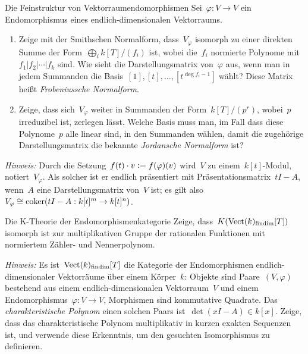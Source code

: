\documentclass{uebblatt}
\begin{document}
\begin{aufgabe}{Die Feinstruktur von Vektorraumendomorphismen}
Sei~$\varphi : V \to V$ ein Endomorphismus eines endlich-dimensionalen
Vektorraums.
\begin{enumerate}
\item Zeige mit der Smithschen Normalform, dass~$V_\varphi$ isomorph zu einer
direkten Summe der Form~$\bigoplus_i k[T]/(f_i)$ ist, wobei die~$f_i$ normierte
Polynome mit~$f_1 | f_2 | \cdots | f_k$ sind.
Wie sieht die Darstellungsmatrix von~$\varphi$ aus, wenn man in jedem
Summanden die Basis~$[1],[t],\ldots,[t^{\deg f_i - 1}]$ wählt? Diese
Matrix heißt \emph{Frobeniussche Normalform}.
\item Zeige, dass sich~$V_\varphi$ weiter in Summanden der Form~$k[T]/(p^r)$,
wobei~$p$ irreduzibel ist, zerlegen lässt. Welche Basis muss man, im Fall
dass diese Polynome~$p$ alle linear sind, in den Summanden wählen, damit die
zugehörige Darstellungsmatrix die bekannte \emph{Jordansche Normalform} ist?
\end{enumerate}
{\tiny\emph{Hinweis:} Durch die Setzung~$f(t) \cdot v \vcentcolon=
f(\varphi)(v)$ wird~$V$ zu einem~$k[t]$-Modul, notiert~$V_\varphi$. Als solcher
ist er endlich präsentiert mit Präsentationsmatrix~$tI - A$, wenn~$A$ eine
Darstellungsmatrix von~$V$ ist; es gilt also~$V_\varphi \cong \operatorname{coker}(tI - A :
k[t]^m \to k[t]^n)$.\par}
\end{aufgabe}

\begin{aufgabe}{Die K-Theorie der Endomorphismenkategorie}
Zeige, dass~$K(\mathrm{Vect}(k)_\text{findim}[T])$ isomorph ist zur
multiplikativen Gruppe der rationalen Funktionen mit normiertem Zähler- und
Nennerpolynom.

{\tiny\emph{Hinweis:} Es ist~$\mathrm{Vect}(k)_\text{findim}[T]$ die Kategorie der
Endomorphismen endlich-dimensionaler Vektorräume über einem Körper~$k$: Objekte
sind Paare~$(V,\varphi)$ bestehend aus einem endlich-dimensionalen
Vektorraum~$V$ und einem Endomorphismus~$\varphi : V \to V$, Morphismen sind
kommutative Quadrate. Das \emph{charakteristische Polynom} einen solchen Paars
ist~$\det(xI-A) \in k[x]$. Zeige, dass das charakteristische Polynom
multiplikativ in kurzen exakten Sequenzen ist, und verwende diese Erkenntnis,
um den gesuchten Isomorphismus zu definieren.\par}
\end{aufgabe}
\end{document}
